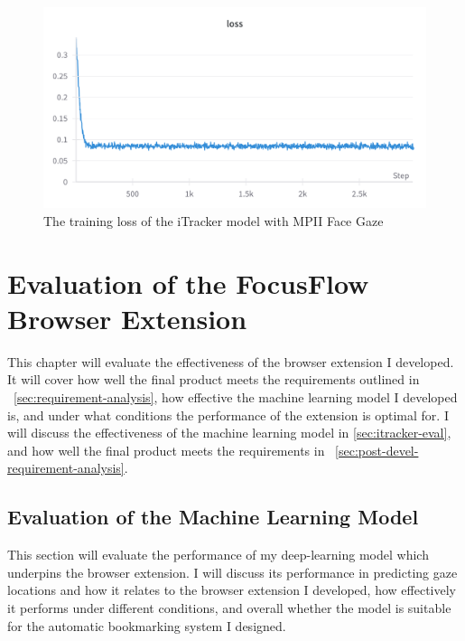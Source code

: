\documentclass{report}
\begin{document}
\begin{figure}
    \begin{center}
        \includegraphics[scale=0.1]{../assets/Training Loss.png}
    \end{center}
    \caption{The training loss of the iTracker model with MPII Face Gaze}
    \label{fig:val}
\end{figure}


\chapter{Evaluation of the FocusFlow Browser Extension}
\label{chap:results}

This chapter will evaluate the effectiveness of the browser extension I developed. It will cover how well the final product meets the requirements outlined in ~\autoref{sec:requirement-analysis}, how effective the machine learning model I developed is, and under what conditions the performance of the extension is optimal for. I will discuss the effectiveness of the machine learning model in \autoref{sec:itracker-eval}, and how well the final product meets the requirements in ~\autoref{sec:post-devel-requirement-analysis}.

\section{Evaluation of the Machine Learning Model}\label{sec:itracker-eval}

This section will evaluate the performance of my deep-learning model which underpins the browser extension. I will discuss its performance in predicting gaze locations and how it relates to the browser extension I developed, how effectively it performs under different conditions, and overall whether the model is suitable for the automatic bookmarking system I designed.
\end{document}
